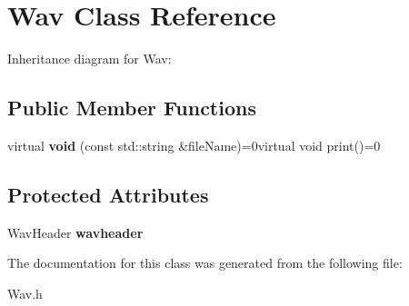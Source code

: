 \hypertarget{classWav}{}\section{Wav Class Reference}
\label{classWav}


Inheritance diagram for Wav\+:
\subsection*{Public Member Functions}
\begin{DoxyCompactItemize}
\item 
\mbox{\label{classWav_ad32c9cf0ca88a631ff5b093184f7cc9b}} 
virtual {\bfseries void} (const std\+::string \&file\+Name)=0virtual void print()=0
\end{DoxyCompactItemize}
\subsection*{Protected Attributes}
\begin{DoxyCompactItemize}
\item 
\mbox{\label{classWav_a37d1beaa16542cdf601a4fefa919d839}} 
Wav\+Header {\bfseries wavheader}
\end{DoxyCompactItemize}


The documentation for this class was generated from the following file\+:\begin{DoxyCompactItemize}
\item 
Wav.\+h\end{DoxyCompactItemize}
